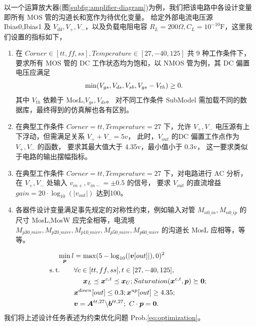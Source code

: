 以一个运算放大器(图\ref{subfig:amplifier-diagram})为例，我们把该电路中各设计变量
即所有 MOS 管的沟道长和宽作为待优化变量。
给定外部电流电压源 Ibias0,Ibias1 及 $V_{dd},V_+,V_-$，以及负载电阻电容
$R_L=200\Omega,C_L=10^{-10}\text{F}$，这里我们设置的指标如下，
\begin{enumerate}[partopsep=0pt,topsep=0pt,itemsep=0pt,parsep=0pt]
  \item 在 $Corner\in[tt,ff,ss],Temperature\in[27,-40,125]$ 共 9 种工作条件下，
    要求所有 MOS 管的 DC 工作状态均为饱和，以 NMOS 管为例，其 DC 偏置电压应满足
    \vspace{-1em}
    \[
      \min(V_{gs},V_{ds},V_{sb},V_{gs}-V_{th})\geq0.
      \vspace{-1em}
    \]
    其中 $V_{th}$ 依赖于 MosL,$V_{gs},V_{ds}$。
    对不同工作条件 SubModel 需加载不同的数据库，最终得到的仿真解也各有区别。
  \item 在典型工作条件 $Corner=tt,Temperature=27$ 下，允许 $V_+,V_-$
    电压源有上下浮动，但需满足关系 $V_++V_-=5v$，
    此时，$V_{out}$ 的DC 偏置工作点作为 $V_+,V_-$ 的函数，
    要求其最大值大于 4.35v，最小值小于 0.3v，
    这一要求类似于电路的输出摆幅指标。
  \item 在典型工作条件 $Corner=tt,Temperature=27$ 下，对电路进行 AC 分析，
    在 $V_+,V_-$ 处输入 $v_{in+},v_{in-}=\pm0.5$ 的信号，
    要求 $V_{out}$ 的直流增益 $gain=20\cdot\log_{10}(|v_{out}|)$ 达到100。
  \item 各器件设计变量满足事先规定的对称性约束，例如输入对管
    $M_{n0\_in},M_{n0\_ip}$ 的尺寸 MosL,MosW 应完全相等，电流境
    $M_{p30\_mirr},M_{p20\_mirr},M_{p10\_mirr},M_{p50\_mirr},M_{p60\_mirr}$
    的沟道长 MosL 应相等，等等。
\end{enumerate}
\begin{equation}\label{eq:optimization}
  \begin{split}
    \min_{\bm{p}} l &= \max(5-\log_{10}(|\bm{v}[out]|),0)^2 \\
    \st \ \ \ \ \ \ 
    & \forall c\in[tt,ff,ss],t\in[27,-40,125], \\
    & \ \ \ \ \bm{x}_L\preceq\bm{x}^{c,t}\preceq\bm{x}_U;
    Saturation(\bm{x}^{c,t},\bm{p})\succeq\bm{0}; \\
    & \bm{x}^{down}[out]\leq0.3;\bm{x}^{up}[out]\geq4.35; \\
    & \bm{v}=\bm{A}^{tt,27}\backslash\bm{b}^{tt,27}; \ C\cdot\bm{p}=\bm{0}.
  \end{split}
\end{equation}
我们将上述设计任务表述为约束优化问题 Prob.\eqref{eq:optimization}。
